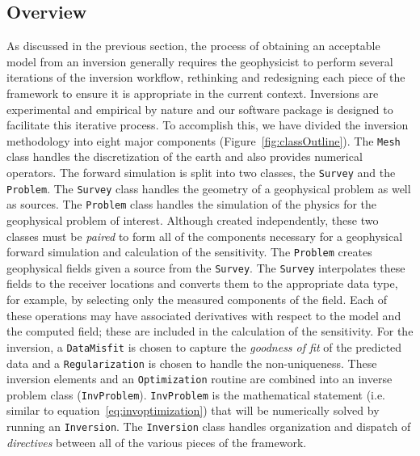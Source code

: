 \documentclass[preprint,review,3p,times,onecolumn,authoryear]{elsarticle}
\newcommand{\Mesh}{\texttt{Mesh}\xspace}
\newcommand{\Survey}{\texttt{Survey}\xspace}
\newcommand{\Problem}{\texttt{Problem}\xspace}
\newcommand{\Regularization}{\texttt{Regularization}\xspace}
\newcommand{\DataMisfit}{\texttt{DataMisfit}\xspace}
\newcommand{\Optimization}{\texttt{Optimization}\xspace}
\newcommand{\InvProblem}{\texttt{InvProblem}\xspace}
\newcommand{\Inversion}{\texttt{Inversion}\xspace}
\begin{document}
\subsection{Overview}
As discussed in the previous section, the process of obtaining an acceptable model
from an inversion generally requires the geophysicist to perform several iterations
of the inversion workflow, rethinking and redesigning each piece of the framework to
ensure it is appropriate in the current context.
Inversions are experimental and empirical by nature and our software package is designed to facilitate this iterative process.
To accomplish this, we have divided the inversion methodology into eight major
components (Figure~\ref{fig:classOutline}).
The \Mesh class handles the discretization of the earth and
also provides numerical operators. The forward simulation is split into two
classes, the \Survey and the \Problem. The \Survey class handles the geometry
of a geophysical problem as well as sources. The \Problem class handles the simulation of the physics for
the geophysical problem of interest. Although created independently, these
two classes must be \emph{paired} to form all of the components necessary for a
geophysical forward simulation and calculation of the sensitivity.
The \Problem creates geophysical fields given a source from the \Survey.
The \Survey interpolates these fields to the receiver locations and converts them to the appropriate data type, for example, by selecting only the measured components of the field.
Each of these operations may have associated derivatives with respect to the model and the computed field; these are included in the calculation of the sensitivity.
For the inversion, a \DataMisfit is chosen to capture the \emph{goodness of fit} of the predicted data and a \Regularization is chosen to handle the non-uniqueness.
These inversion elements and an \Optimization routine are combined into an inverse problem class (\InvProblem).
\InvProblem is the mathematical statement (i.e. similar to equation~\ref{eq:invoptimization})
that will be numerically solved by running an \Inversion. The \Inversion
class handles organization and dispatch of \emph{directives} between all
of the various pieces of the framework.
\end{document}
